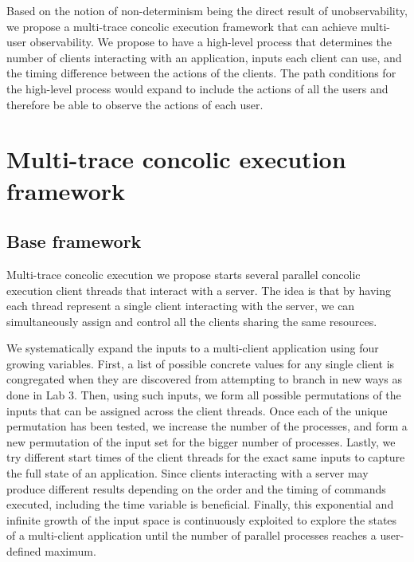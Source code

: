 \documentclass{llncs}
\begin{document}
Based on the notion of non-determinism being the direct result of
unobservability, we propose a multi-trace concolic execution framework
that can achieve multi-user observability. We propose to have a
high-level process that determines the number of clients interacting
with an application, inputs each client can use, and the timing
difference between the actions of the clients. The path conditions for
the high-level process would expand to include the actions of all the
users and therefore be able to observe the actions of each user.

\section{Multi-trace concolic execution framework}

\subsection{Base framework}

Multi-trace concolic execution we propose starts several parallel
concolic execution client threads that interact with a server. The
idea is that by having each thread represent a single client
interacting with the server, we can simultaneously assign and control
all the clients sharing the same resources.

We systematically expand the inputs to a multi-client application
using four growing variables. First, a list of possible concrete
values for any single client is congregated when they are discovered
from attempting to branch in new ways as done in Lab 3. Then, using
such inputs, we form all possible permutations of the inputs that can
be assigned across the client threads. Once each of the unique
permutation has been tested, we increase the number of the processes,
and form a new permutation of the input set for the bigger number of
processes. Lastly, we try different start times of the client threads
for the exact same inputs to capture the full state of an
application. Since clients interacting with a server may produce
different results depending on the order and the timing of commands
executed, including the time variable is beneficial. Finally, this
exponential and infinite growth of the input space is continuously
exploited to explore the states of a multi-client application until
the number of parallel processes reaches a user-defined maximum.

\end{document}

